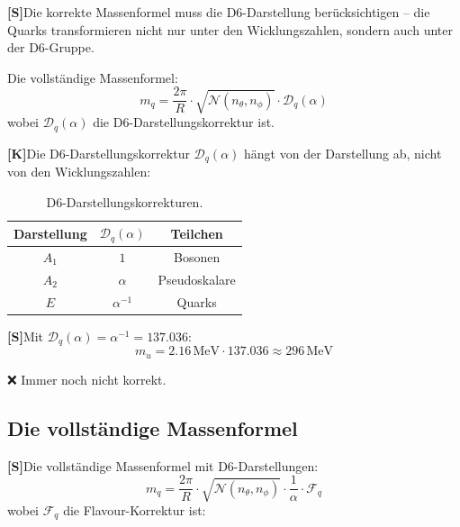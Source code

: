\documentclass[11pt,a4paper]{article}
\newcommand{\Kstatus}{\textbf{[K]}}
\newcommand{\Sstatus}{\textbf{[S]}}
\begin{document}
	\Sstatus Die korrekte Massenformel muss die D6-Darstellung berücksichtigen -- die Quarks transformieren nicht nur unter den Wicklungszahlen, sondern auch unter der D6-Gruppe.
	
	Die vollständige Massenformel:
	\begin{equation}
		m_q = \frac{2\pi}{R} \cdot \sqrt{\mathcal{N}(n_\theta, n_\phi)} \cdot \mathcal{D}_q(\alpha)
	\end{equation}
	wobei $\mathcal{D}_q(\alpha)$ die D6-Darstellungskorrektur ist.
	
	\Kstatus Die D6-Darstellungskorrektur $\mathcal{D}_q(\alpha)$ hängt von der Darstellung ab, nicht von den Wicklungszahlen:
	
	\begin{table}[h!]
		\centering
		\caption{D6-Darstellungskorrekturen.}
		\label{tab:d6_corrections}
		\begin{tabular}{c c c}
			\toprule
			\textbf{Darstellung} & $\mathcal{D}_q(\alpha)$ & \textbf{Teilchen} \\
			\midrule
			$A_1$ & $1$ & Bosonen \\
			$A_2$ & $\alpha$ & Pseudoskalare \\
			$E$ & $\alpha^{-1}$ & Quarks \\
			\bottomrule
		\end{tabular}
	\end{table}
	
	\Sstatus Mit $\mathcal{D}_q(\alpha) = \alpha^{-1} = 137.036$:
	\begin{equation}
		m_u = 2.16\,\text{MeV} \cdot 137.036 \approx 296\,\text{MeV}
	\end{equation}
	
	❌ Immer noch nicht korrekt.
	
	\subsection{Die vollständige Massenformel}
	
	\Sstatus Die vollständige Massenformel mit D6-Darstellungen:
	\begin{equation}
		m_q = \frac{2\pi}{R} \cdot \sqrt{\mathcal{N}(n_\theta, n_\phi)} \cdot \frac{1}{\alpha} \cdot \mathcal{F}_q
	\end{equation}
	wobei $\mathcal{F}_q$ die Flavour-Korrektur ist:
	
\end{document}
